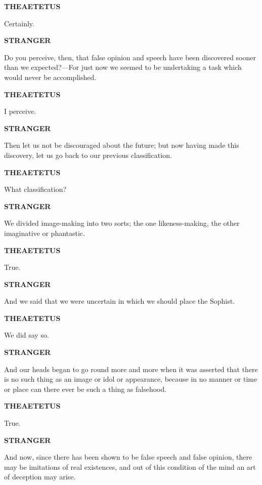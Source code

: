 \documentclass[11pt,letter]{article}
\begin{document}
\par \textbf{THEAETETUS}
\par   Certainly.

\par \textbf{STRANGER}
\par   Do you perceive, then, that false opinion and speech have been discovered sooner than we expected?—For just now we seemed to be undertaking a task which would never be accomplished.

\par \textbf{THEAETETUS}
\par   I perceive.

\par \textbf{STRANGER}
\par   Then let us not be discouraged about the future; but now having made this discovery, let us go back to our previous classification.

\par \textbf{THEAETETUS}
\par   What classification?

\par \textbf{STRANGER}
\par   We divided image-making into two sorts; the one likeness-making, the other imaginative or phantastic.

\par \textbf{THEAETETUS}
\par   True.

\par \textbf{STRANGER}
\par   And we said that we were uncertain in which we should place the Sophist.

\par \textbf{THEAETETUS}
\par   We did say so.

\par \textbf{STRANGER}
\par   And our heads began to go round more and more when it was asserted that there is no such thing as an image or idol or appearance, because in no manner or time or place can there ever be such a thing as falsehood.

\par \textbf{THEAETETUS}
\par   True.

\par \textbf{STRANGER}
\par   And now, since there has been shown to be false speech and false opinion, there may be imitations of real existences, and out of this condition of the mind an art of deception may arise.
\end{document}
